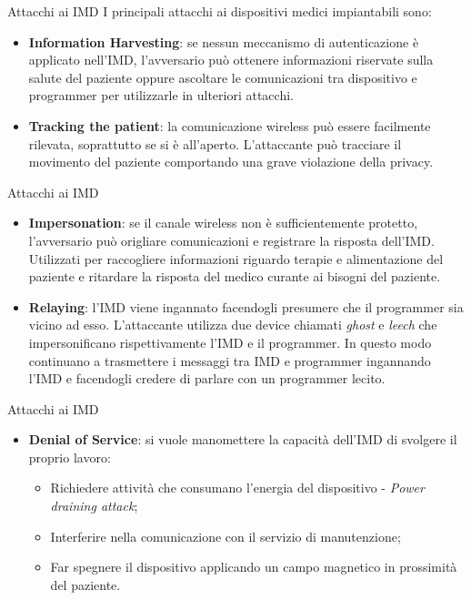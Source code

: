 \documentclass{beamer}
\begin{document}
\begin{frame}{Attacchi ai IMD}
    I principali attacchi ai dispositivi medici impiantabili sono:
    \begin{itemize}
        \item \textbf{Information Harvesting}: se nessun meccanismo di autenticazione è applicato nell'IMD, l'avversario può ottenere informazioni 
        riservate sulla salute del paziente oppure ascoltare le comunicazioni tra dispositivo e programmer per utilizzarle in ulteriori attacchi. 
        \item \textbf{Tracking the patient}: la comunicazione wireless può essere facilmente rilevata, soprattutto se si è all'aperto. L'attaccante 
        può tracciare il movimento del paziente comportando una grave violazione della privacy.        
    \end{itemize}
\end{frame}

\begin{frame}{Attacchi ai IMD}
    \begin{itemize}
        \item \textbf{Impersonation}: se il canale wireless non è sufficientemente protetto, l'avversario può origliare comunicazioni e registrare
        la risposta dell'IMD. 
        Utilizzati per raccogliere informazioni riguardo terapie e alimentazione del paziente e ritardare la risposta del medico curante ai bisogni del 
        paziente.
        \item \textbf{Relaying}: l'IMD viene ingannato facendogli presumere che il programmer sia vicino ad esso. L'attaccante utilizza due device 
        chiamati \textit{ghost} e \textit{leech} che impersonificano rispettivamente l'IMD e il programmer. In questo modo continuano a 
        trasmettere i messaggi tra IMD e programmer ingannando l'IMD  e facendogli credere di parlare con un programmer lecito.
    \end{itemize}
\end{frame}

\begin{frame}{Attacchi ai IMD}
    \begin{itemize}
        \item \textbf{Denial of Service}: si vuole manomettere la capacità dell'IMD di svolgere il proprio lavoro: 
            \begin{itemize}
                \item Richiedere attività che consumano l'energia del dispositivo - \textit{Power draining attack};
                \item Interferire nella comunicazione con il servizio di manutenzione;
                \item Far spegnere il dispositivo applicando un campo magnetico in prossimità del paziente.
            \end{itemize}
    \end{itemize}
\end{frame}
\end{document}

